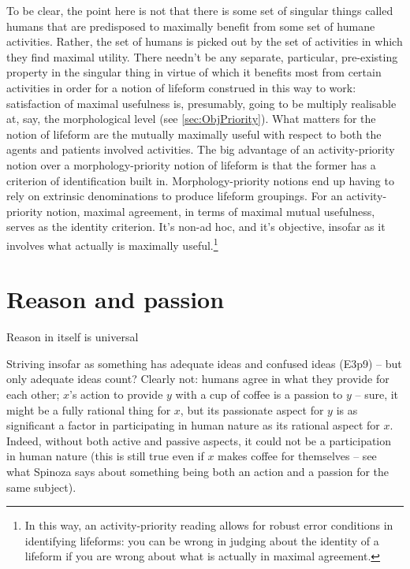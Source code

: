 \documentclass{article}
\newcommand{\dash}{\unskip{—}}
\begin{document}
To be clear, the point here is not that there is some set of singular things called humans that are predisposed to maximally benefit from some set of humane activities. Rather, the set of humans is picked out by the set of activities in which they find maximal utility. There needn't be any separate, particular, pre-existing property in the singular thing in virtue of which it benefits most from certain activities in order for a notion of lifeform construed in this way to work: satisfaction of maximal usefulness is, presumably, going to be multiply realisable at, say, the morphological level (see \cref{sec:ObjPriority}). What matters for the notion of lifeform are the mutually maximally useful \dash with respect to both the agents and patients involved \dash activities. The big advantage of an activity-priority notion over a morphology-priority notion of lifeform is that the former has a criterion of identification built in. Morphology-priority notions end up having to rely on extrinsic denominations to produce lifeform groupings. For an activity-priority notion, maximal agreement, in terms of maximal mutual usefulness, serves as the identity criterion. It's non-ad hoc, and it's objective, insofar as it involves what actually is maximally useful.\footnote{In this way, an activity-priority reading allows for robust error conditions in identifying lifeforms: you can be wrong in judging about the identity of a lifeform if you are wrong about what is actually in maximal agreement.}


\section{Reason and passion}\label{sec:Reason}
Reason in itself is universal

Striving insofar as something has adequate ideas and confused ideas (E3p9) – but only adequate ideas count? Clearly not: humans agree in what they provide for each other; $x$'s action to provide $y$ with a cup of coffee is a passion to $y$ – sure, it might be a fully rational thing for $x$, but its passionate aspect for $y$ is as significant a factor in participating in human nature as its rational aspect for $x$. Indeed, without both active and passive aspects, it could not be a participation in human nature (this is still true even if $x$ makes coffee for themselves – see what Spinoza says about something being both an action and a passion for the same subject).
\end{document}
